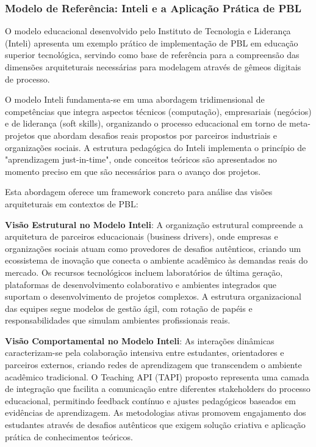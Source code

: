 \documentclass[12pt,a4paper]{article}
\begin{document}
\subsubsection{Modelo de Referência: Inteli e a Aplicação Prática de PBL}

O modelo educacional desenvolvido pelo Instituto de Tecnologia e Liderança (Inteli) \cite{inteli2024} apresenta um exemplo prático de implementação de PBL em educação superior tecnológica, servindo como base de referência para a compreensão das dimensões arquiteturais necessárias para modelagem através de gêmeos digitais de processo.

O modelo Inteli fundamenta-se em uma abordagem tridimensional de competências que integra aspectos técnicos (computação), empresariais (negócios) e de liderança (soft skills), organizando o processo educacional em torno de meta-projetos que abordam desafios reais propostos por parceiros industriais e organizações sociais. A estrutura pedagógica do Inteli implementa o princípio de "aprendizagem just-in-time", onde conceitos teóricos são apresentados no momento preciso em que são necessários para o avanço dos projetos.

Esta abordagem oferece um framework concreto para análise das visões arquiteturais em contextos de PBL:

\textbf{Visão Estrutural no Modelo Inteli}: A organização estrutural compreende a arquitetura de parceiros educacionais (business drivers), onde empresas e organizações sociais atuam como provedores de desafios autênticos, criando um ecossistema de inovação que conecta o ambiente acadêmico às demandas reais do mercado. Os recursos tecnológicos incluem laboratórios de última geração, plataformas de desenvolvimento colaborativo e ambientes integrados que suportam o desenvolvimento de projetos complexos. A estrutura organizacional das equipes segue modelos de gestão ágil, com rotação de papéis e responsabilidades que simulam ambientes profissionais reais.

\textbf{Visão Comportamental no Modelo Inteli}: As interações dinâmicas caracterizam-se pela colaboração intensiva entre estudantes, orientadores e parceiros externos, criando redes de aprendizagem que transcendem o ambiente acadêmico tradicional. O Teaching API (TAPI) proposto representa uma camada de integração que facilita a comunicação entre diferentes stakeholders do processo educacional, permitindo feedback contínuo e ajustes pedagógicos baseados em evidências de aprendizagem. As metodologias ativas promovem engajamento dos estudantes através de desafios autênticos que exigem solução criativa e aplicação prática de conhecimentos teóricos.
\end{document}
